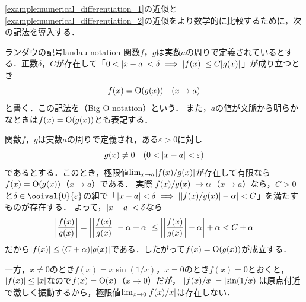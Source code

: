 \documentclass[../../main]{subfiles}
\begin{document}
\cref{example:numerical_differentiation_1}の近似と\cref{example:numerical_differentiation_2}の近似をより数学的に比較するために，次の記法を導入する．

\begin{definition}{ランダウの記号}{landau-notation}
関数\(f\)，\(g\)は実数\(a\)の周りで定義されているとする．正数\(\delta\)，\(C\)が存在して「\(0<\abs{x-a}<\delta\implies\abs{f(x)}\leq C\abs{g(x)}\)」が成り立つとき
\[
  f(x) = \Order(g(x))\quad(x\to a)
\]
と書く．この記法を（Big O notation）という．
また，\(a\)の値が文脈から明らかなときは\(f(x)=\Order(g(x))\)とも表記する．
\end{definition}

\begin{example}
\label{example:bigo_ratio}
関数\(f\)，\(g\)は実数\(a\)の周りで定義され，ある\(\varepsilon>0\)に対し
\[
  g(x)\neq 0\quad(0<\abs{x-a}<\varepsilon)
\]
であるとする．このとき，極限値\(\lim_{x\to a}\abs{f(x)/g(x)}\)が存在して有限なら\(f(x)=\Order(g(x))\)（\(x\to a\)）である．
実際\(\abs{f(x)/g(x)}\to\alpha\)（\(x\to a\)）なら，\(C>0\)と\(\delta\in\ooival{0}{\varepsilon}\)の組で「\(\abs{x-a}<\delta\implies\abs{\abs{f(x)/g(x)}-\alpha}<C\)」を満たすものが存在する．
よって，\(\abs{x-a}<\delta\)なら
\[
  \abs*{\frac{f(x)}{g(x)}} = \abs*{\abs*{\frac{f(x)}{g(x)}}-\alpha+\alpha}
  \leq \abs*{\abs*{\frac{f(x)}{g(x)}}-\alpha}+\alpha
  < C+\alpha
\]
だから\(\abs{f(x)}\leq(C+\alpha)\abs{g(x)}\)である．したがって\(f(x)=\Order(g(x))\)が成立する．

一方，\(x\neq 0\)のとき\(f(x)=x\sin(1/x)\)，\(x=0\)のとき\(f(x)=0\)とおくと，\(\abs{f(x)}\leq\abs{x}\)なので\(f(x)=\Order(x)\)（\(x\to 0\)）だが，
\(\abs{f(x)/x}=\abs{\sin(1/x)}\)は原点付近で激しく振動するから，極限値\(\lim_{x\to 0}\abs{f(x)/x}\)は存在しない．
\end{example}
\end{document}

